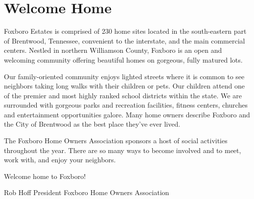 \section{Welcome Home}

Foxboro Estates is comprised of 230 home sites located in the
south-eastern part of Brentwood, Tennessee, convenient to the interstate,
and the main commercial centers. Nestled in northern Williamson County,
Foxboro is an open and welcoming community offering beautiful homes on
gorgeous, fully matured lots.

Our family-oriented community enjoys lighted streets where it is common
to see neighbors taking long walks with their children or pets. Our
children attend one of the premier and most highly ranked school districts
within the state. We are surrounded with gorgeous parks and recreation
facilities, fitness centers, churches and entertainment opportunities
galore. Many home owners describe Foxboro and the City of Brentwood as
the best place they've ever lived.

The Foxboro Home Owners Association sponsors a host of social activities
throughout the year. There are so many ways to become involved and to
meet, work with, and enjoy your neighbors.

Welcome home to Foxboro!

Rob Hoff
President Foxboro Home Owners Association
